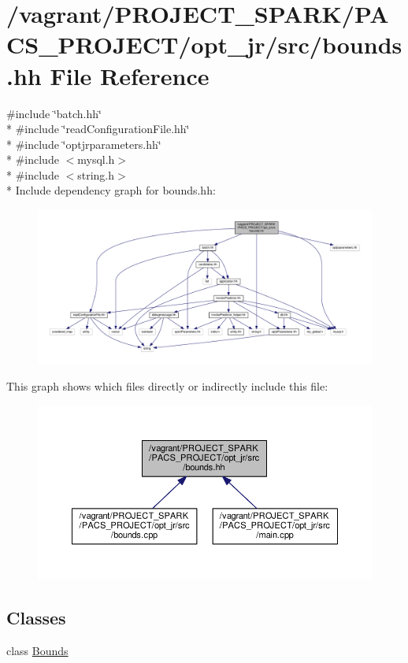 \hypertarget{bounds_8hh}{\section{/vagrant/\-P\-R\-O\-J\-E\-C\-T\-\_\-\-S\-P\-A\-R\-K/\-P\-A\-C\-S\-\_\-\-P\-R\-O\-J\-E\-C\-T/opt\-\_\-jr/src/bounds.hh File Reference}
\label{bounds_8hh}
}
{\ttfamily \#include \char`\"{}batch.\-hh\char`\"{}}\\*
{\ttfamily \#include \char`\"{}read\-Configuration\-File.\-hh\char`\"{}}\\*
{\ttfamily \#include \char`\"{}optjrparameters.\-hh\char`\"{}}\\*
{\ttfamily \#include $<$mysql.\-h$>$}\\*
{\ttfamily \#include $<$string.\-h$>$}\\*
Include dependency graph for bounds.\-hh\-:\nopagebreak
\begin{figure}[H]
\begin{center}
\leavevmode
\includegraphics[width=350pt]{bounds_8hh__incl}
\end{center}
\end{figure}
This graph shows which files directly or indirectly include this file\-:\nopagebreak
\begin{figure}[H]
\begin{center}
\leavevmode
\includegraphics[width=350pt]{bounds_8hh__dep__incl}
\end{center}
\end{figure}
\subsection*{Classes}
\begin{DoxyCompactItemize}
\item 
class \hyperlink{classBounds}{Bounds}
\end{DoxyCompactItemize}
